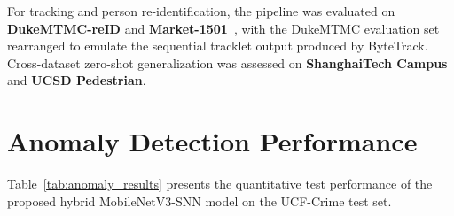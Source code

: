 \documentclass[12pt,a4paper]{report}
\begin{document}
\begin{table}[H]
    \centering
    \caption{UCF-Crime Dataset Statistics.}
    \label{tab:ucf_crime_stats}
\end{table}

For tracking and person re-identification, the pipeline was evaluated on \textbf{DukeMTMC-reID} and \textbf{Market-1501}~\cite{ref_zheng2016_reid_survey}, with the DukeMTMC evaluation set rearranged to emulate the sequential tracklet output produced by ByteTrack. Cross-dataset zero-shot generalization was assessed on \textbf{ShanghaiTech Campus} and \textbf{UCSD Pedestrian}.

\section{Anomaly Detection Performance}
Table~\ref{tab:anomaly_results} presents the quantitative test performance of the proposed hybrid MobileNetV3-SNN model on the UCF-Crime test set.
\end{document}
